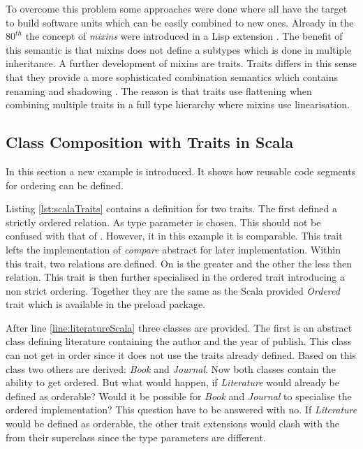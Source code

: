 To overcome this problem some approaches were done where all
have the target to build software units which can be easily
combined to new ones. Already in the $80^{th}$ the concept of
\emph{mixins} were introduced
in a Lisp extension \cite{moon_object-oriented_1986}. The benefit
of this semantic is that mixins does not define a subtypes which is
done in multiple inheritance. A further development of mixins are
traits. Traits differs in this sense that they provide a more
sophisticated combination semantics which contains renaming and shadowing
\cite{schaerli_traits:_2003}. The reason is that traits use flattening
when combining multiple traits in a full type hierarchy where mixins
use linearisation.

\subsection{Class Composition with Traits in Scala}
In this section a new example is introduced. It shows how reusable code
segments for ordering can be defined.

Listing \ref{lst:scalaTraits} contains a definition for two traits. The
first defined a strictly ordered relation. As type parameter is \mytype
chosen. This should not be confused with that of \ooplss. However, it
in this example it is comparable. This trait lefts the implementation
of \emph{compare} abstract for later implementation. Within this trait,
two relations are defined. On is the greater and the other the less then
relation. This trait is then further specialised in the ordered trait
introducing a non strict ordering. Together they are the same as the Scala
provided \emph{Ordered} trait which is available in the preload package.

After line \ref{line:literatureScala} three classes are provided. The
first is an abstract class defining literature containing the author
and the year of publish. This class can not get in order since it does
not use the traits already defined. Based on this class two others are
derived: \emph{Book} and \emph{Journal}. Now both classes contain the
ability to get ordered. But what would happen, if \emph{Literature} would
already be defined as orderable? Would it be possible for \emph{Book}
and \emph{Journal} to specialise the ordered implementation? This question
have to be answered with no. If \emph{Literature} would be defined as
orderable, the other trait extensions would clash with the from their
superclass since the type parameters are different.

